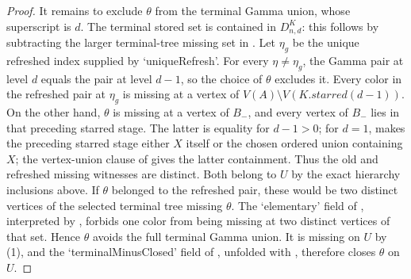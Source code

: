 \begin{proof}
It remains to exclude $\theta$ from the terminal Gamma union, whose
superscript is $d$.  The terminal stored set is contained in
$D^K_{n,d}$: this follows by subtracting the larger terminal-tree missing
set in .  Let $\eta_g$ be the
unique refreshed index supplied by `uniqueRefresh'.  For every
$\eta\ne\eta_g$, the Gamma pair at level $d$ equals the pair at level
$d-1$, so the choice of $\theta$ excludes it.  Every color in the
refreshed pair at $\eta_g$ is missing at a vertex of
$V(A)\setminus V(K.\mathit{starred}(d-1))$.  On the other hand,
$\theta$ is missing at a vertex of $B_-$, and every vertex of $B_-$ lies
in that preceding starred stage.  The latter is equality for $d-1>0$;
for $d=1$,  makes the preceding starred
stage either $X$ itself or the chosen ordered union containing $X$; the
vertex-union clause of  gives the latter
containment.  Thus the old and refreshed missing witnesses are distinct.
Both belong to $U$ by the exact hierarchy inclusions above.  If $\theta$
belonged to the refreshed pair, these would be two distinct vertices of
the selected terminal tree missing $\theta$.  The `elementary' field of
, interpreted by
, forbids one color from being
missing at two distinct vertices of that set.  Hence $\theta$ avoids the
full terminal Gamma union.  It is missing on $U$ by (1), and the
`terminalMinusClosed' field of
, unfolded with
, therefore closes $\theta$ on $U$.
\end{proof}
